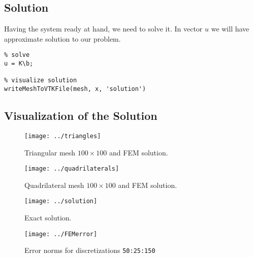 \documentclass[unicode,11pt,a4paper,oneside,numbers=endperiod,openany]{scrartcl}
\begin{document}
\subsection{Solution}
Having the system ready at hand, we need to solve it. In vector $u$ we will have approximate solution to our problem.
\begin{lstlisting}
% solve
u = K\b;

% visualize solution
writeMeshToVTKFile(mesh, x, 'solution')
\end{lstlisting}


\subsection{Visualization of the Solution}
\begin{figure}[h]
    \centering
    \texttt{[image: ../triangles]}
    \caption{Triangular mesh $100 \times 100$ and FEM solution.}
    \label{fig:mesh_tr}
\end{figure}

\begin{figure}[h]
    \centering
    \texttt{[image: ../quadrilaterals]}
    \caption{Quadrilateral mesh $100 \times 100$ and FEM solution.}
    \label{fig:mesh_quad}
\end{figure}

\begin{figure}[h]
    \centering
    \texttt{[image: ../solution]}
    \caption{Exact solution.}
    \label{fig:solution}
\end{figure}

\begin{figure}[h]
    \centering
    \texttt{[image: ../FEMerror]}
    \caption{Error norms for discretizations \texttt{50:25:150}}
    \label{fig:norms}
\end{figure}
\end{document}
